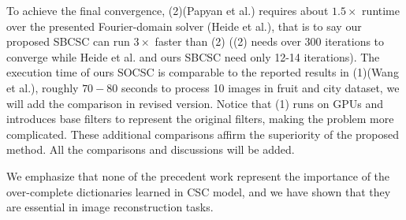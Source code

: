 \documentclass[10pt,twocolumn,letterpaper]{article}
\begin{document}
To achieve the final convergence, (2)(Papyan et al.) requires about $1.5 \times$ runtime over the presented Fourier-domain solver (Heide et al.), that is to say our proposed SBCSC can run $3 \times$ faster than (2) ((2) needs over 300 iterations to converge while Heide et al. and ours SBCSC need only 12-14 iterations). The execution time of ours SOCSC is comparable to the reported results in (1)(Wang et al.), roughly $70-80$ seconds to process 10 images in fruit and city dataset, we will add the comparison in revised version. Notice that (1) runs on GPUs and introduces base filters to represent the original filters, making the problem more complicated. These additional comparisons affirm the superiority of the proposed method. All the comparisons and discussions will be added.

We emphasize that none of the precedent work represent the importance of the over-complete dictionaries learned in CSC model, and we have shown that they are essential in image reconstruction tasks.

%
%
\end{document}
